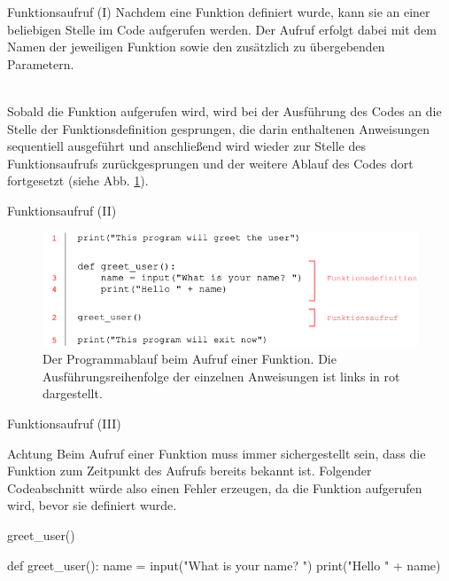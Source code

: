     \begin{frame}{Funktionsaufruf (I)}
        Nachdem eine Funktion definiert wurde, kann sie an einer beliebigen Stelle im Code aufgerufen werden. Der Aufruf erfolgt dabei mit dem Namen der jeweiligen Funktion sowie den zusätzlich zu übergebenden Parametern. \\~\
        
        Sobald die Funktion aufgerufen wird, wird bei der Ausführung des Codes an die Stelle der Funktionsdefinition gesprungen, die darin enthaltenen Anweisungen sequentiell ausgeführt und anschließend wird wieder zur Stelle des Funktionsaufrufs zurückgesprungen und der weitere Ablauf des Codes dort fortgesetzt (siehe Abb. \ref{fig:function-flow}).
    \end{frame}
    
    \begin{frame}{Funktionsaufruf (II)}
        \begin{figure}
                \centering
                \includegraphics[width=0.8\linewidth,height=0.8\textheight,keepaspectratio]{chapters/09_python3_control_flow/figures/function-flow.png}
                \caption{Der Programmablauf beim Aufruf einer Funktion. Die Ausführungsreihenfolge der einzelnen Anweisungen ist links in rot dargestellt.}
                \label{fig:function-flow}
            \end{figure}
    \end{frame}
    
    \begin{frame}[fragile]{Funktionsaufruf (III)}
        \begin{alertblock}{Achtung}
            Beim Aufruf einer Funktion muss immer sichergestellt sein, dass die Funktion zum Zeitpunkt des Aufrufs bereits bekannt ist. Folgender Codeabschnitt würde also einen Fehler erzeugen, da die Funktion aufgerufen wird, bevor sie definiert wurde.
            
\begin{pythoncode}
greet_user()

def greet_user():
    name = input("What is your name? ")
    print("Hello " + name) 
\end{pythoncode}
        \end{alertblock}
    \end{frame}
    
